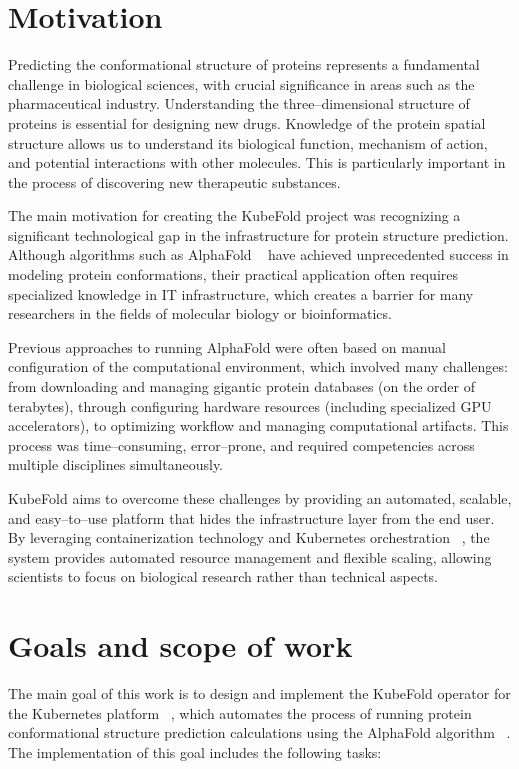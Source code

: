 \section{Motivation}

Predicting the conformational structure of proteins represents a fundamental challenge in biological sciences, with crucial significance in areas such as the pharmaceutical industry.
Understanding the three--dimensional structure of proteins is essential for designing new drugs.
Knowledge of the protein spatial structure allows us to understand its biological function, mechanism of action, and potential interactions with other molecules.
This is particularly important in the process of discovering new therapeutic substances.

The main motivation for creating the KubeFold project was recognizing a significant technological gap in the infrastructure for protein structure prediction.
Although algorithms such as AlphaFold ~\cite{alphafold3} have achieved unprecedented success in modeling protein conformations, their practical application often requires specialized knowledge in IT infrastructure, which creates a barrier for many researchers in the fields of molecular biology or bioinformatics.

Previous approaches to running AlphaFold were often based on manual configuration of the computational environment, which involved many challenges: from downloading and managing gigantic protein databases (on the order of terabytes), through configuring hardware resources (including specialized GPU accelerators), to optimizing workflow and managing computational artifacts.
This process was time--consuming, error--prone, and required competencies across multiple disciplines simultaneously.

KubeFold aims to overcome these challenges by providing an automated, scalable, and easy--to--use platform that hides the infrastructure layer from the end user.
By leveraging containerization technology and Kubernetes orchestration ~\cite{kubernetes, container_orchestration}, the system provides automated resource management and flexible scaling, allowing scientists to focus on biological research rather than technical aspects.


\section{Goals and scope of work}

The main goal of this work is to design and implement the KubeFold operator for the Kubernetes platform ~\cite{kubernetes}, which automates the process of running protein conformational structure prediction calculations using the AlphaFold algorithm ~\cite{alphafold3}.
The implementation of this goal includes the following tasks:

